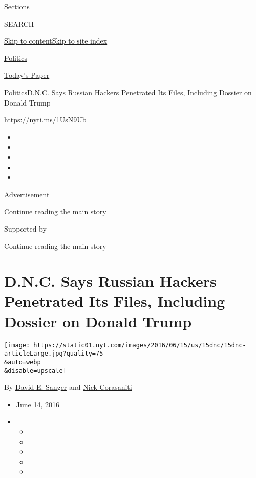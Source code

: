 Sections

SEARCH

\protect\hyperlink{site-content}{Skip to
content}\protect\hyperlink{site-index}{Skip to site index}

\href{https://www.nytimes.com/section/politics}{Politics}

\href{https://myaccount.nytimes.com/auth/login?response_type=cookie\&client_id=vi}{}

\href{https://www.nytimes.com/section/todayspaper}{Today's Paper}

\href{/section/politics}{Politics}\textbar{}D.N.C. Says Russian Hackers
Penetrated Its Files, Including Dossier on Donald Trump

\url{https://nyti.ms/1UsN9Ub}

\begin{itemize}
\item
\item
\item
\item
\item
\end{itemize}

Advertisement

\protect\hyperlink{after-top}{Continue reading the main story}

Supported by

\protect\hyperlink{after-sponsor}{Continue reading the main story}

\hypertarget{dnc-says-russian-hackers-penetrated-its-files-including-dossier-on-donald-trump}{%
\section{D.N.C. Says Russian Hackers Penetrated Its Files, Including
Dossier on Donald
Trump}\label{dnc-says-russian-hackers-penetrated-its-files-including-dossier-on-donald-trump}}

\texttt{[image: https://static01.nyt.com/images/2016/06/15/us/15dnc/15dnc-articleLarge.jpg?quality=75\\\&auto=webp\\\&disable=upscale]}

By \href{http://www.nytimes.com/by/david-e-sanger}{David E. Sanger} and
\href{http://www.nytimes.com/by/nick-corasaniti}{Nick Corasaniti}

\begin{itemize}
\item
  June 14, 2016
\item
  \begin{itemize}
  \item
  \item
  \item
  \item
  \item
  \end{itemize}
\end{itemize}

